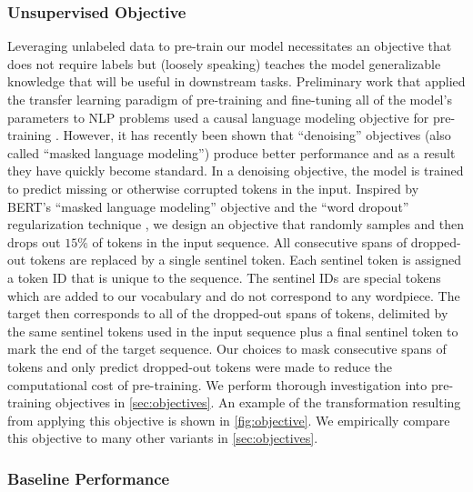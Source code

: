 \subsubsection{Unsupervised Objective}
\label{sec:baseline_objective}

Leveraging unlabeled data to pre-train our model necessitates an objective that does not require labels but (loosely speaking) teaches the model generalizable knowledge that will be useful in downstream tasks. Preliminary work that applied the transfer learning paradigm of pre-training and fine-tuning all of the model's parameters to NLP problems used a causal language modeling objective for pre-training \citep{dai2015semi,peters2018deep,radford2018improving,howard2018universal}. However, it has recently been shown that ``denoising'' objectives \citep{devlin2018bert,taylor1953cloze} (also called ``masked language modeling'') produce better performance and as a result they have quickly become standard. In a denoising objective, the model is trained to predict missing or otherwise corrupted tokens in the input. Inspired by BERT's ``masked language modeling'' objective and the ``word dropout'' regularization technique \citep{bowman2015generating}, we design an objective that randomly samples and then drops out $15\%$ of tokens in the input sequence. All consecutive spans of dropped-out tokens are replaced by a single sentinel token. Each sentinel token is assigned a token ID that is unique to the sequence. The sentinel IDs are special tokens which are added to our vocabulary and do not correspond to any wordpiece. The target then corresponds to all of the dropped-out spans of tokens, delimited by the same sentinel tokens used in the input sequence plus a final sentinel token to mark the end of the target sequence. Our choices to mask consecutive spans of tokens and only predict dropped-out tokens were made to reduce the computational cost of pre-training. We perform thorough investigation into pre-training objectives in \ref{sec:objectives}.
An example of the transformation resulting from applying this objective is shown in \ref{fig:objective}.
We empirically compare this objective to many other variants in \ref{sec:objectives}.

\subsubsection{Baseline Performance}

